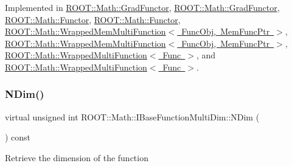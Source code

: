 Implemented in \mbox{\hyperlink{classROOT_1_1Math_1_1GradFunctor_a7ff4ed4ad6f7c17d74403a443990f069}{R\+O\+O\+T\+::\+Math\+::\+Grad\+Functor}}, \mbox{\hyperlink{classROOT_1_1Math_1_1GradFunctor_a7ff4ed4ad6f7c17d74403a443990f069}{R\+O\+O\+T\+::\+Math\+::\+Grad\+Functor}}, \mbox{\hyperlink{classROOT_1_1Math_1_1Functor_a2544e2ed3c6a0420084c7b08eb3c3130}{R\+O\+O\+T\+::\+Math\+::\+Functor}}, \mbox{\hyperlink{classROOT_1_1Math_1_1Functor_a2544e2ed3c6a0420084c7b08eb3c3130}{R\+O\+O\+T\+::\+Math\+::\+Functor}}, \mbox{\hyperlink{classROOT_1_1Math_1_1WrappedMemMultiFunction_ae9aaf3de1f2e1e6e1c1310fccdb06009}{R\+O\+O\+T\+::\+Math\+::\+Wrapped\+Mem\+Multi\+Function$<$ Func\+Obj, Mem\+Func\+Ptr $>$}}, \mbox{\hyperlink{classROOT_1_1Math_1_1WrappedMemMultiFunction_ae9aaf3de1f2e1e6e1c1310fccdb06009}{R\+O\+O\+T\+::\+Math\+::\+Wrapped\+Mem\+Multi\+Function$<$ Func\+Obj, Mem\+Func\+Ptr $>$}}, \mbox{\hyperlink{classROOT_1_1Math_1_1WrappedMultiFunction_a99de9f7a6e26b03b1cdcf35d8c62d761}{R\+O\+O\+T\+::\+Math\+::\+Wrapped\+Multi\+Function$<$ Func $>$}}, and \mbox{\hyperlink{classROOT_1_1Math_1_1WrappedMultiFunction_a99de9f7a6e26b03b1cdcf35d8c62d761}{R\+O\+O\+T\+::\+Math\+::\+Wrapped\+Multi\+Function$<$ Func $>$}}.

\mbox{\label{classROOT_1_1Math_1_1IBaseFunctionMultiDim_a16f37dc7a6d00c75ddeda0697741315d}} 
\subsubsection{\texorpdfstring{NDim()}{NDim()}\hspace{0.1cm}{\footnotesize\ttfamily [2/2]}}
{\footnotesize\ttfamily virtual unsigned int R\+O\+O\+T\+::\+Math\+::\+I\+Base\+Function\+Multi\+Dim\+::\+N\+Dim (\begin{DoxyParamCaption}{ }\end{DoxyParamCaption}) const\hspace{0.3cm}{\ttfamily [pure virtual]}}

Retrieve the dimension of the function 

